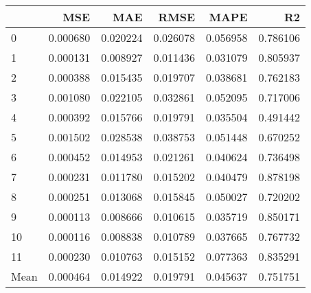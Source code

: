 \begin{tabular}{lrrrrr}
\toprule
 & MSE & MAE & RMSE & MAPE & R2 \\
\midrule
0 & 0.000680 & 0.020224 & 0.026078 & 0.056958 & 0.786106 \\
1 & 0.000131 & 0.008927 & 0.011436 & 0.031079 & 0.805937 \\
2 & 0.000388 & 0.015435 & 0.019707 & 0.038681 & 0.762183 \\
3 & 0.001080 & 0.022105 & 0.032861 & 0.052095 & 0.717006 \\
4 & 0.000392 & 0.015766 & 0.019791 & 0.035504 & 0.491442 \\
5 & 0.001502 & 0.028538 & 0.038753 & 0.051448 & 0.670252 \\
6 & 0.000452 & 0.014953 & 0.021261 & 0.040624 & 0.736498 \\
7 & 0.000231 & 0.011780 & 0.015202 & 0.040479 & 0.878198 \\
8 & 0.000251 & 0.013068 & 0.015845 & 0.050027 & 0.720202 \\
9 & 0.000113 & 0.008666 & 0.010615 & 0.035719 & 0.850171 \\
10 & 0.000116 & 0.008838 & 0.010789 & 0.037665 & 0.767732 \\
11 & 0.000230 & 0.010763 & 0.015152 & 0.077363 & 0.835291 \\
Mean & 0.000464 & 0.014922 & 0.019791 & 0.045637 & 0.751751 \\
\bottomrule
\end{tabular}
